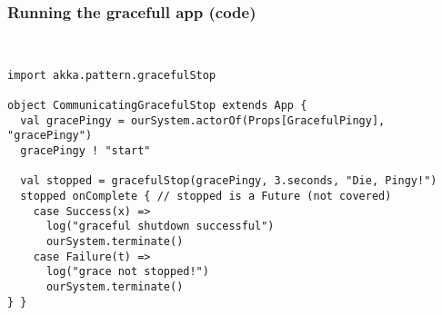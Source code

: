 \documentclass[aspectratio=169]{beamer}
\begin{document}
\begin{frame}[fragile]\frametitle{Running the gracefull app (code)}
~\\[-6mm]
\begin{lstlisting}[emph={Actor, Logging, Props, ourSystem,terminate,sleep,actorOf,receive,become,stop,onComplete,gracefulStop}]
import akka.pattern.gracefulStop

object CommunicatingGracefulStop extends App {
  val gracePingy = ourSystem.actorOf(Props[GracefulPingy], "gracePingy")
  gracePingy ! "start"

  val stopped = gracefulStop(gracePingy, 3.seconds, "Die, Pingy!")
  stopped onComplete { // stopped is a Future (not covered)
    case Success(x) =>
      log("graceful shutdown successful")
      ourSystem.terminate()
    case Failure(t) =>
      log("grace not stopped!")
      ourSystem.terminate()
} }
\end{lstlisting}
\end{frame}
\end{document}

